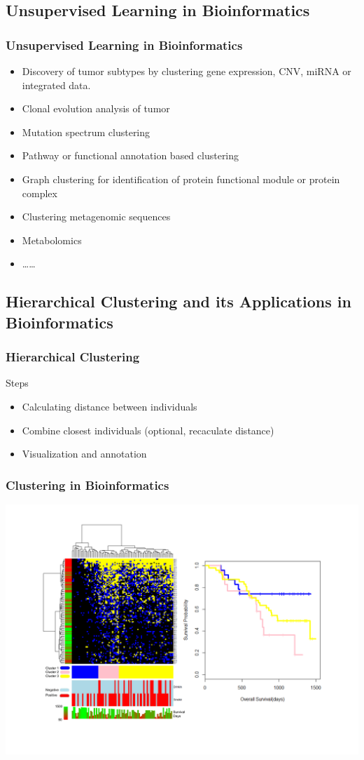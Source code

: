 \documentclass[UTF8]{beamer}\usepackage[]{graphicx}\usepackage[]{color}
\begin{document}
\subsection{Unsupervised Learning in Bioinformatics}
\begin{frame}
\frametitle{Unsupervised Learning in Bioinformatics}
\begin{itemize}
	\item Discovery of tumor subtypes by clustering gene expression, CNV, miRNA or integrated data.
	\item Clonal evolution analysis of tumor
	\item Mutation spectrum clustering
	\item Pathway or functional annotation based clustering
	\item Graph clustering for identification of protein functional module or protein complex
	\item Clustering metagenomic sequences
	\item Metabolomics
	\item \ldots \ldots
\end{itemize}
\end{frame}

\subsection{Hierarchical Clustering and its Applications in Bioinformatics}
\begin{frame}[fragile]
  \frametitle{Hierarchical Clustering}
\begin{block}{Steps}
  \begin{itemize}
  \item Calculating distance between individuals
  \item Combine closest individuals (optional, recaculate distance)
  \item Visualization and annotation
  \end{itemize}
\end{block}
\end{frame}

\begin{frame}[fragile]
  \frametitle{Clustering in Bioinformatics}
\includegraphics[width=\textwidth]{mutation.pdf}
\end{frame}
\end{document}

